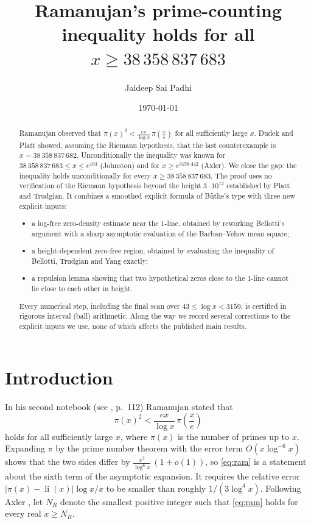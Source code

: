 \documentclass[11pt]{amsart}
\title[Ramanujan's prime-counting inequality]{Ramanujan's prime-counting inequality holds for all $x \geq 38\,358\,837\,683$}
\author{Jaideep Sai Padhi}
\date{\today}
\numberwithin{equation}{section}
\theoremstyle{definition}
\theoremstyle{remark}
\newcommand{\li}{\operatorname{li}}
\begin{document}
\sloppy
\begin{abstract}
Ramanujan observed that $\pi(x)^2 < \frac{e x}{\log x}\,\pi\!\left(\frac{x}{e}\right)$ for all sufficiently large $x$.
Dudek and Platt showed, assuming the Riemann hypothesis, that the last counterexample is $x = 38\,358\,837\,682$.
Unconditionally the inequality was known for $38\,358\,837\,683 \le x \le e^{103}$ (Johnston) and for $x \ge e^{3158.442}$ (Axler).
We close the gap: the inequality holds unconditionally for every $x \ge 38\,358\,837\,683$.
The proof uses no verification of the Riemann hypothesis beyond the height $3\cdot 10^{12}$ established by Platt and Trudgian.
It combines a smoothed explicit formula of B\"uthe's type with three new explicit inputs:
\begin{itemize}
\item a log-free zero-density estimate near the $1$-line, obtained by reworking Bellotti's argument with a sharp asymptotic evaluation of the Barban--Vehov mean square;
\item a height-dependent zero-free region, obtained by evaluating the inequality of Bellotti, Trudgian and Yang exactly;
\item a repulsion lemma showing that two hypothetical zeros close to the $1$-line cannot lie close to each other in height.
\end{itemize}
Every numerical step, including the final scan over $43\le\log x<3159$, is certified in rigorous interval (ball) arithmetic.
Along the way we record several corrections to the explicit inputs we use, none of which affects the published main results.
\end{abstract}
\maketitle
\tableofcontents
\section{Introduction}

In his second notebook (see \cite{BerndtIV}, p.~112) Ramanujan stated that
\begin{equation}\label{eq:ram}
\pi(x)^2 < \frac{e x}{\log x}\, \pi\!\left(\frac{x}{e}\right)
\end{equation}
holds for all sufficiently large $x$, where $\pi(x)$ is the number of primes up to $x$.
Expanding $\pi$ by the prime number theorem with the error term $O(x\log^{-6}x)$ shows that the two sides differ by
$\frac{x^2}{\log^6 x}\,(1+o(1))$, so \eqref{eq:ram} is a statement about the sixth term of the asymptotic expansion.
It requires the relative error $|\pi(x)-\li(x)|\log x/x$ to be smaller than roughly $1/(3\log^4 x)$.
Following Axler \cite{Axler}, let $N_R$ denote the smallest positive integer such that \eqref{eq:ram} holds for every real $x \ge N_R$.
\end{document}
